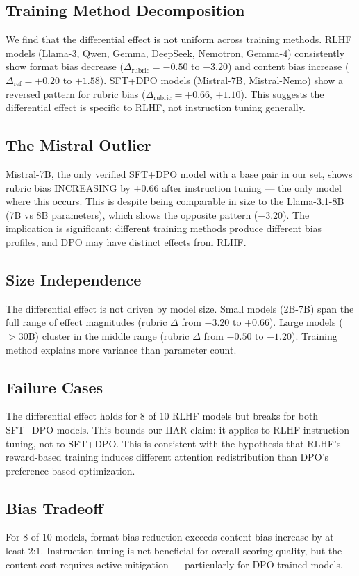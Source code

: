 \subsection{Training Method Decomposition}

We find that the differential effect is not uniform across training methods. RLHF models (Llama-3, Qwen, Gemma, DeepSeek, Nemotron, Gemma-4) consistently show format bias decrease ($\Delta_{\text{rubric}} = -0.50$ to $-3.20$) and content bias increase ($\Delta_{\text{ref}} = +0.20$ to $+1.58$). SFT+DPO models (Mistral-7B, Mistral-Nemo) show a reversed pattern for rubric bias ($\Delta_{\text{rubric}} = +0.66$, $+1.10$). This suggests the differential effect is specific to RLHF, not instruction tuning generally.

\subsection{The Mistral Outlier}

Mistral-7B, the only verified SFT+DPO model with a base pair in our set, shows rubric bias INCREASING by $+0.66$ after instruction tuning --- the only model where this occurs. This is despite being comparable in size to the Llama-3.1-8B (7B vs 8B parameters), which shows the opposite pattern ($-3.20$). The implication is significant: different training methods produce different bias profiles, and DPO may have distinct effects from RLHF.

\subsection{Size Independence}

The differential effect is not driven by model size. Small models (2B-7B) span the full range of effect magnitudes (rubric $\Delta$ from $-3.20$ to $+0.66$). Large models ($>30$B) cluster in the middle range (rubric $\Delta$ from $-0.50$ to $-1.20$). Training method explains more variance than parameter count.

\subsection{Failure Cases}

The differential effect holds for 8 of 10 RLHF models but breaks for both SFT+DPO models. This bounds our IIAR claim: it applies to RLHF instruction tuning, not to SFT+DPO. This is consistent with the hypothesis that RLHF's reward-based training induces different attention redistribution than DPO's preference-based optimization.

\subsection{Bias Tradeoff}

For 8 of 10 models, format bias reduction exceeds content bias increase by at least 2:1. Instruction tuning is net beneficial for overall scoring quality, but the content cost requires active mitigation --- particularly for DPO-trained models.

